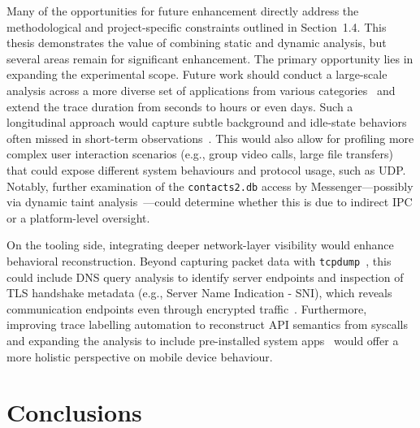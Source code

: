 \documentclass[a4paper,12pt]{report}
\begin{document}
Many of the opportunities for future enhancement directly address the methodological and project-specific constraints outlined in Section~1.4. This thesis demonstrates the value of combining static and dynamic analysis, but several areas remain for significant enhancement. The primary opportunity lies in expanding the experimental scope. Future work should conduct a large-scale analysis across a more diverse set of applications from various categories~\cite{lindorfer2014andrubis} and extend the trace duration from seconds to hours or even days. Such a longitudinal approach would capture subtle background and idle-state behaviors often missed in short-term observations~\cite{Razaghpanah2020AppsTrackers}. This would also allow for profiling more complex user interaction scenarios (e.g., group video calls, large file transfers) that could expose different system behaviours and protocol usage, such as UDP. Notably, further examination of the \texttt{contacts2.db} access by Messenger—possibly via dynamic taint analysis~\cite{enck2014taintdroid}—could determine whether this is due to indirect IPC or a platform-level oversight.

On the tooling side, integrating deeper network-layer visibility would enhance behavioral reconstruction. Beyond capturing packet data with \texttt{tcpdump}~\cite{lindorfer2014andrubis}, this could include DNS query analysis to identify server endpoints and inspection of TLS handshake metadata (e.g., Server Name Indication - SNI), which reveals communication endpoints even through encrypted traffic~\cite{apthorpe2018smart}. Furthermore, improving trace labelling automation to reconstruct API semantics from syscalls~\cite{nisi2019syscall} and expanding the analysis to include pre-installed system apps~\cite{Tian2020Preinstalled} would offer a more holistic perspective on mobile device behaviour.


\chapter{Conclusions}
\end{document}
